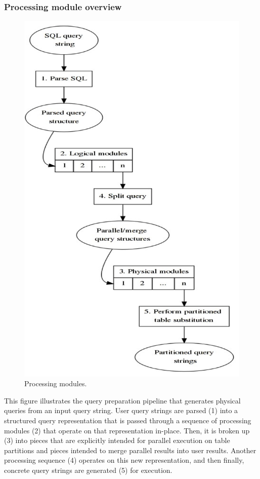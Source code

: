 \documentclass[DM,toc]{lsstdoc}
\begin{document}
\subsubsection{Processing module
overview}\label{processing-module-overview}

\begin{figure}[H]
\centering
\includegraphics{_static/processing_modules.png}
\caption{Processing modules.}
\end{figure}

This figure illustrates the query preparation pipeline that generates
physical queries from an input query string. User query strings are
parsed (1) into a structured query representation that is passed through
a sequence of processing modules (2) that operate on that representation
in-place. Then, it is broken up (3) into pieces that are explicitly
intended for parallel execution on table partitions and pieces intended
to merge parallel results into user results. Another processing sequence
(4) operates on this new representation, and then finally, concrete
query strings are generated (5) for execution.
\end{document}
